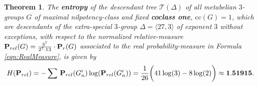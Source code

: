 \documentclass{amsart}
\newtheorem{theorem}{Theorem}[section]
\theoremstyle{definition}
\theoremstyle{remark}
\begin{document}
\begin{theorem}
\label{thm:CoClassOne}
The \textbf{entropy} of the descendant tree
\(\mathcal{T}(\Delta)\)
of all metabelian \(3\)-groups \(G\) of maximal nilpotency-class and fixed \textbf{coclass one},
\(\mathrm{cc}(G)=1\),
which are descendants of the extra-special \(3\)-group
\(\Delta=\langle 27,3\rangle\)
of exponent \(3\) without exceptions,
with respect to the normalized relative-measure
\({\bf P}_{rel}(G)=\frac{3^7}{2^7\cdot 13}\cdot{\bf P}_{r}(G)\)
associated to the real probability-measure in Formula
\eqref{eqn:RealMeasure},
is given by
\begin{equation}
\label{eqn:Entropy1}
H({\bf P}_{rel})
=-\sum\,{\bf P}_{rel}(G_n^i)\log({\bf P}_{rel}(G_n^i))
=\frac{1}{26}\biggl(41\log(3)-8\log(2)\biggr)
\approx{\bf 1.51915}.
\end{equation}
\end{theorem}
\end{document}
